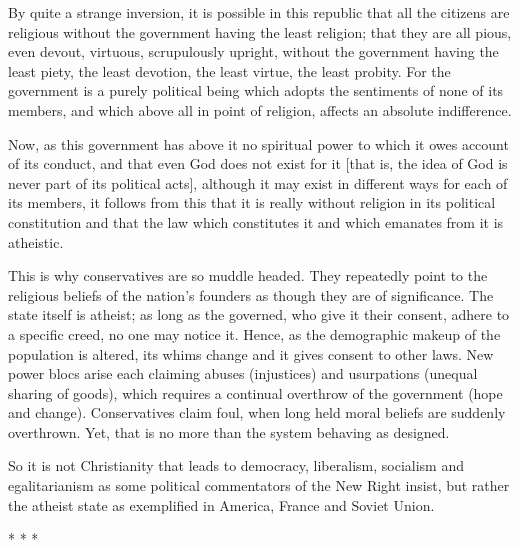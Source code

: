 \begin{quotex}
By quite a strange inversion, it is possible in this republic that all the citizens are religious without the government having the least religion; that they are all pious, even devout, virtuous, scrupulously upright, without the government having the least piety, the least devotion, the least virtue, the least probity. For the government is a purely political being which adopts the sentiments of none of its members, and which above all in point of religion, affects an absolute indifference.

Now, as this government has above it no spiritual power to which it owes account of its conduct, and that even God does not exist for it [that is, the idea of God is never part of its political acts], although it may exist in different ways for each of its members, it follows from this that it is really without religion in its political constitution and that the law which constitutes it and which emanates from it is atheistic. 

\end{quotex}
This is why conservatives are so muddle headed. They repeatedly point to the religious beliefs of the nation's founders as though they are of significance. The state itself is atheist; as long as the governed, who give it their consent, adhere to a specific creed, no one may notice it. Hence, as the demographic makeup of the population is altered, its whims change and it gives consent to other laws. New power blocs arise each claiming abuses (injustices) and usurpations (unequal sharing of goods), which requires a continual overthrow of the government (hope and change). Conservatives claim foul, when long held moral beliefs are suddenly overthrown. Yet, that is no more than the system behaving as designed.

So it is not Christianity that leads to democracy, liberalism, socialism and egalitarianism as some political commentators of the New Right insist, but rather the atheist state as exemplified in America, France and Soviet Union.




\begin{center}* * *\end{center}


